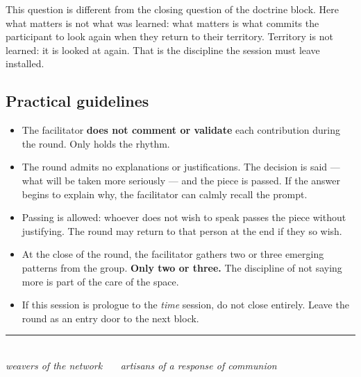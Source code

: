 \documentclass[11pt, a4paper]{article}
\begin{document}
\vspace{0.5em}

This question is different from the closing question of the doctrine block. Here what matters is not what was learned: what matters is what commits the participant to look again when they return to their territory. Territory is not learned: it is looked at again. That is the discipline the session must leave installed.

\subsection*{Practical guidelines}

\begin{itemize}
  \item The facilitator \textbf{does not comment or validate} each contribution during the round. Only holds the rhythm.
  \item The round admits no explanations or justifications. The decision is said --- what will be taken more seriously --- and the piece is passed. If the answer begins to explain why, the facilitator can calmly recall the prompt.
  \item Passing is allowed: whoever does not wish to speak passes the piece without justifying. The round may return to that person at the end if they so wish.
  \item At the close of the round, the facilitator gathers two or three emerging patterns from the group. \textbf{Only two or three.} The discipline of not saying more is part of the care of the space.
  \item If this session is prologue to the \emph{time} session, do not close entirely. Leave the round as an entry door to the next block.
\end{itemize}

\vspace{2em}

\begin{center}
{\color{regla}\rule{0.35\linewidth}{0.5pt}}\\
\vspace{0.6em}
{\color{tenue}\itshape\small weavers of the network \ \textbullet\ \ artisans of a response of communion}
\end{center}
\end{document}

